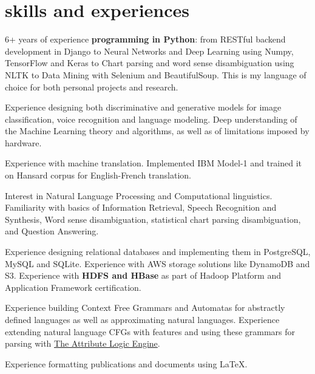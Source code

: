 \documentclass[]{cv-roald}
\begin{document}

\section*{skills and experiences}
\begin{tabitemize}
    \item 6+ years of experience \textbf{programming in Python}: from RESTful backend development in Django to Neural Networks and Deep Learning using Numpy, TensorFlow and Keras to Chart parsing and word sense disambiguation using NLTK to Data Mining with Selenium and BeautifulSoup. This is my language of choice for both personal projects and research. 
    \item Experience designing both discriminative and generative models for image classification, voice recognition and language modeling. Deep understanding of the Machine Learning theory and algorithms, as well as of limitations imposed by hardware. 
    \item Experience with machine translation. Implemented IBM Model-1 and trained it on Hansard corpus for English-French translation.
    \item Interest in Natural Language Processing and Computational linguistics. Familiarity with basics of Information Retrieval, Speech Recognition and Synthesis, Word sense disambiguation, statistical chart parsing disambiguation, and Question Answering.
    \item Experience designing relational databases and implementing them in PostgreSQL, MySQL and SQLite. Experience with AWS storage solutions like DynamoDB and S3. Experience with \textbf{HDFS and HBase} as part of Hadoop Platform and Application Framework certification.
    \item Experience building Context Free Grammars and Automatas for abstractly defined languages as well as approximating natural languages. Experience extending natural language CFGs with features and using these grammars for parsing with \href{http://www.cs.toronto.edu/~gpenn/ale.html}{The Attribute Logic Engine}. 
    \item Experience formatting publications and documents using \LaTeX.

\end{tabitemize}
\end{document}
